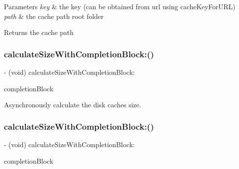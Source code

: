\begin{DoxyParams}{Parameters}
{\em key} & the key (can be obtained from url using cache\+Key\+For\+U\+RL) \\
\hline
{\em path} & the cache path root folder\\
\hline
\end{DoxyParams}
\begin{DoxyReturn}{Returns}
the cache path 
\end{DoxyReturn}
\mbox{\label{interface_s_d_image_cache_a276a37cdab08d116906f65040bad9c99}} 
\subsubsection{\texorpdfstring{calculate\+Size\+With\+Completion\+Block\+:()}{calculateSizeWithCompletionBlock:()}\hspace{0.1cm}{\footnotesize\ttfamily [1/3]}}
{\footnotesize\ttfamily -\/ (void) calculate\+Size\+With\+Completion\+Block\+: \begin{DoxyParamCaption}\item[{(S\+D\+Web\+Image\+Calculate\+Size\+Block)}]{completion\+Block }\end{DoxyParamCaption}}

Asynchronously calculate the disk cache\textquotesingle{}s size. \mbox{\label{interface_s_d_image_cache_a276a37cdab08d116906f65040bad9c99}} 
\subsubsection{\texorpdfstring{calculate\+Size\+With\+Completion\+Block\+:()}{calculateSizeWithCompletionBlock:()}\hspace{0.1cm}{\footnotesize\ttfamily [2/3]}}
{\footnotesize\ttfamily -\/ (void) calculate\+Size\+With\+Completion\+Block\+: \begin{DoxyParamCaption}\item[{(S\+D\+Web\+Image\+Calculate\+Size\+Block)}]{completion\+Block }\end{DoxyParamCaption}}


